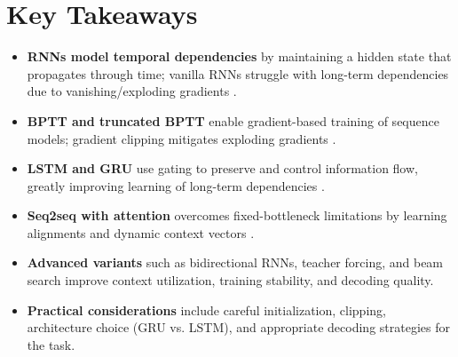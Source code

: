 
\section*{Key Takeaways}
\label{sec:ch10-key-takeaways}

\begin{itemize}
    \item \textbf{RNNs model temporal dependencies} by maintaining a hidden state that propagates through time; vanilla RNNs struggle with long-term dependencies due to vanishing/exploding gradients \cite{GoodfellowEtAl2016}.
    \item \textbf{BPTT and truncated BPTT} enable gradient-based training of sequence models; gradient clipping mitigates exploding gradients \cite{GoodfellowEtAl2016,Rumelhart1986}.
    \item \textbf{LSTM and GRU} use gating to preserve and control information flow, greatly improving learning of long-term dependencies \cite{Hochreiter1997,Cho2014}.
    \item \textbf{Seq2seq with attention} overcomes fixed-bottleneck limitations by learning alignments and dynamic context vectors \cite{Bahdanau2014}.
    \item \textbf{Advanced variants} such as bidirectional RNNs, teacher forcing, and beam search improve context utilization, training stability, and decoding quality.
    \item \textbf{Practical considerations} include careful initialization, clipping, architecture choice (GRU vs. LSTM), and appropriate decoding strategies for the task.
\end{itemize}


